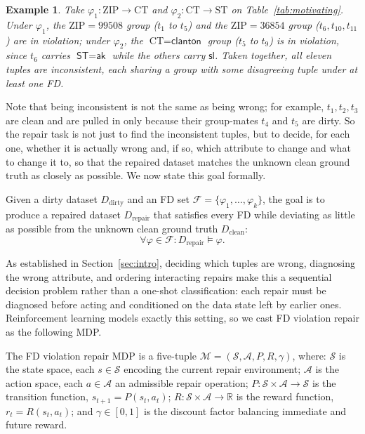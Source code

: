\documentclass[sigconf]{acmart}
\newtheorem{example}{Example}
\begin{document}
\begin{example}
Take $\varphi_1: \text{ZIP} \rightarrow \text{CT}$ and $\varphi_2: \text{CT} \rightarrow \text{ST}$ on Table~\ref{tab:motivating}. Under $\varphi_1$, the $\text{ZIP}=99508$ group ($t_1$ to $t_5$) and the $\text{ZIP}=36854$ group ($t_6, t_{10}, t_{11}$) are in violation; under $\varphi_2$, the $\text{CT}=\textsf{clanton}$ group ($t_5$ to $t_9$) is in violation, since $t_6$ carries $\textsf{ST}=\textsf{ak}$ while the others carry $\textsf{sl}$. Taken together, all eleven tuples are inconsistent, each sharing a group with some disagreeing tuple under at least one FD.
\end{example}

Note that being inconsistent is not the same as being wrong; for example, $t_1, t_2, t_3$ are clean and are pulled in only because their group-mates $t_4$ and $t_5$ are dirty. So the repair task is not just to find the inconsistent tuples, but to decide, for each one, whether it is actually wrong and, if so, which attribute to change and what to change it to, so that the repaired dataset matches the unknown clean ground truth as closely as possible. We now state this goal formally.



\begin{definition}
Given a dirty dataset $D_{\text{dirty}}$ and an FD set $\mathcal{F} = \{\varphi_1, \ldots, \varphi_k\}$, the goal is to produce a repaired dataset $D_{\text{repair}}$ that satisfies every FD while deviating as little as possible from the unknown clean ground truth $D_{\text{clean}}$:
\begin{equation}
\forall \varphi \in \mathcal{F}: D_{\text{repair}} \models \varphi.
\end{equation}
\end{definition}

As established in Section~\ref{sec:intro}, deciding which tuples are wrong, diagnosing the wrong attribute, and ordering interacting repairs make this a sequential decision problem rather than a one-shot classification: each repair must be diagnosed before acting and conditioned on the data state left by earlier ones. Reinforcement learning models exactly this setting, so we cast FD violation repair as the following MDP.

\begin{definition}
\label{sec:MDP definition}
The FD violation repair MDP is a five-tuple $\mathcal{M} = (\mathcal{S}, \mathcal{A}, P, R, \gamma)$, where:
$\mathcal{S}$ is the state space, each $s \in \mathcal{S}$ encoding the current repair environment;
$\mathcal{A}$ is the action space, each $a \in \mathcal{A}$ an admissible repair operation;
$P: \mathcal{S} \times \mathcal{A} \rightarrow \mathcal{S}$ is the transition function, $s_{t+1} = P(s_t, a_t)$;
$R: \mathcal{S} \times \mathcal{A} \rightarrow \mathbb{R}$ is the reward function, $r_t = R(s_t, a_t)$; and
$\gamma \in [0,1]$ is the discount factor balancing immediate and future reward.
\end{definition}
\end{document}

